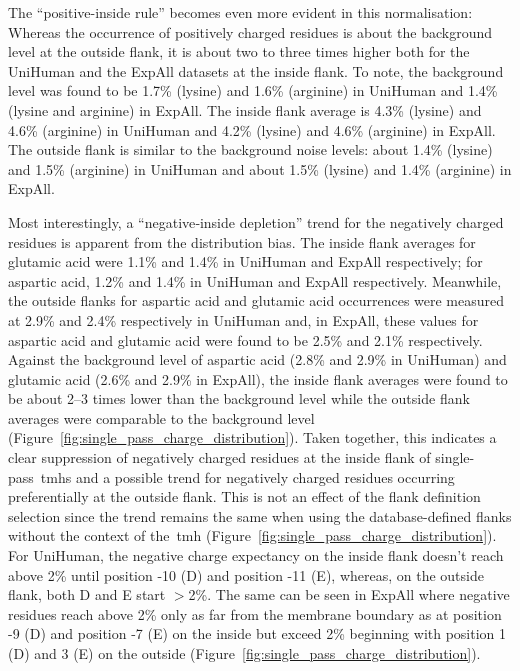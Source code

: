 The ``positive-inside rule'' becomes even more evident in this normalisation: Whereas the occurrence of positively charged residues is about the background level at the outside flank, it is about two to three times higher both for the UniHuman and the ExpAll datasets at the inside flank.
To note, the background level was found to be 1.7\% (lysine) and 1.6\% (arginine) in UniHuman and 1.4\% (lysine and arginine) in ExpAll.
The inside flank average is 4.3\% (lysine) and 4.6\% (arginine) in UniHuman and 4.2\% (lysine) and 4.6\% (arginine) in ExpAll.
The outside flank is similar to the background noise levels: about 1.4\% (lysine) and 1.5\% (arginine) in UniHuman and about 1.5\% (lysine) and 1.4\% (arginine) in ExpAll.

Most interestingly, a ``negative‑inside depletion'' trend for the negatively charged residues is apparent from the distribution bias.
The inside flank averages for glutamic acid were 1.1\% and 1.4\% in UniHuman and ExpAll respectively; for aspartic acid, 1.2\% and 1.4\% in UniHuman and ExpAll respectively.
Meanwhile, the outside flanks for aspartic acid and glutamic acid occurrences were measured at 2.9\% and 2.4\% respectively in UniHuman and, in ExpAll, these values for aspartic acid and glutamic acid were found to be 2.5\% and 2.1\% respectively.
Against the background level of aspartic acid (2.8\% and 2.9\% in UniHuman) and glutamic acid (2.6\% and 2.9\% in ExpAll), the inside flank averages were found to be about 2--3 times lower than the background level while the outside flank averages were comparable to the background level (Figure~\ref{fig:single_pass_charge_distribution}).
Taken together, this indicates a clear suppression of negatively charged residues at the inside flank of single-pass~\gls{tmh}s and a possible trend for negatively charged residues occurring preferentially at the outside flank.
This is not an effect of the flank definition selection since the trend remains the same when using the database-defined flanks without the context of the~\gls{tmh} (Figure~\ref{fig:single_pass_charge_distribution}).
For UniHuman, the negative charge expectancy on the inside flank doesn’t reach above 2\% until position -10 (D) and position -11 (E), whereas, on the outside flank, both D and E start $>$2\%.
The same can be seen in ExpAll where negative residues reach above 2\% only as far from the membrane boundary as at position -9 (D) and position -7 (E) on the inside but exceed 2\% beginning with position 1 (D) and 3 (E) on the outside (Figure~\ref{fig:single_pass_charge_distribution}).

